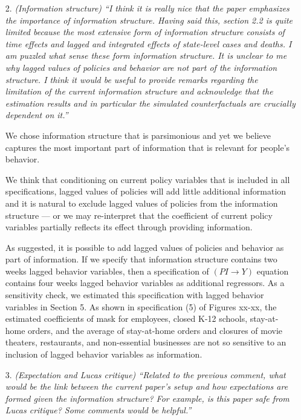 \documentclass[11pt]{article}
\begin{document}
\begin{itemize}
  
\item[2. ]  \textit{(Information structure) ``I think it is really nice that the paper emphasizes the importance of
information structure. Having said this, section 2.2 is quite limited because the most extensive
form of information structure consists of time effects and lagged and integrated effects
of state-level cases and deaths. I am puzzled what sense these form information structure. It
is unclear to me why lagged values of policies and behavior are not part of the information 
structure. I think it would be useful to provide remarks regarding the limitation of the current
information structure and acknowledge that the estimation results and in particular the
simulated counterfactuals are crucially dependent on it.''}
  
We chose information structure that is parsimonious and yet we believe captures the most important part of information that is relevant for people's behavior. 

We think that conditioning on current policy variables that is included in all specifications, lagged values of policies will  add little additional information and it is natural to exclude lagged values of policies from the information structure --- or we may re-interpret that the coefficient of current policy variables partially reflects its effect through providing information. 

As suggested, it is possible to add lagged values of policies and behavior as part of information. If we specify that information structure contains two weeks lagged behavior variables, then a specification of $(PI\rightarrow Y)$ equation contains four weeks lagged behavior variables as additional regressors. As a sensitivity check, we estimated this specification with lagged behavior variables in Section 5. As shown in specification (5) of Figures xx-xx, the estimated coefficients of mask for employees, closed K-12 schools, stay-at-home orders, and the average of stay-at-home orders and closures of movie theaters, restaurants, and non-essential businesses are not so sensitive to an inclusion of lagged behavior variables as information.
  
 
  
\item[3.]  \textit{(Expectation and Lucas critique) ``Related to the previous comment, what would be the link
between the current paper’s setup and how expectations are formed given the information
structure? For example, is this paper safe from Lucas critique? Some comments would be
helpful.''}
  

\end{itemize}
\end{document}
